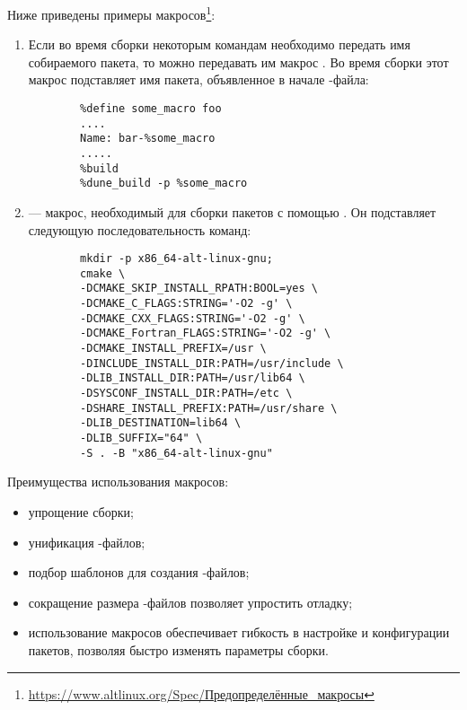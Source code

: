 Ниже приведены примеры макросов\footnote{\href{https://www.altlinux.org/Spec/\%D0\%9F\%D1\%80\%D0\%B5\%D0\%B4\%D0\%BE\%D0\%BF\%D1\%80\%D0\%B5\%D0\%B4\%D0\%B5\%D0\%BB\%D0\%B5\%D0\%BD\%D0\%BD\%D1\%8B\%D0\%B5_\%D0\%BC\%D0\%B0\%D0\%BA\%D1\%80\%D0\%BE\%D1\%81\%D1\%8B}{https://www.altlinux.org/Spec/Предопределённые\_макросы}}:
\begin{enumerate}
	\item {}
		Если во время сборки некоторым командам необходимо передать имя собираемого пакета,
		то можно передавать им макрос . Во время сборки этот макрос подставляет
		имя пакета, объявленное в начале -файла:
\begin{verbatim}
        %define some_macro foo
        ....
        Name: bar-%some_macro
        .....
        %build
        %dune_build -p %some_macro
\end{verbatim}
	
	\item {}
	 --- макрос, необходимый для сборки пакетов с помощью .
		Он подставляет следующую последовательность команд:
\begin{verbatim}
        mkdir -p x86_64-alt-linux-gnu;
        cmake \
        -DCMAKE_SKIP_INSTALL_RPATH:BOOL=yes \
        -DCMAKE_C_FLAGS:STRING='-O2 -g' \
        -DCMAKE_CXX_FLAGS:STRING='-O2 -g' \
        -DCMAKE_Fortran_FLAGS:STRING='-O2 -g' \
        -DCMAKE_INSTALL_PREFIX=/usr \
        -DINCLUDE_INSTALL_DIR:PATH=/usr/include \
        -DLIB_INSTALL_DIR:PATH=/usr/lib64 \
        -DSYSCONF_INSTALL_DIR:PATH=/etc \
        -DSHARE_INSTALL_PREFIX:PATH=/usr/share \
        -DLIB_DESTINATION=lib64 \
        -DLIB_SUFFIX="64" \
        -S . -B "x86_64-alt-linux-gnu"
\end{verbatim}
\end{enumerate}

Преимущества использования макросов:
\begin{itemize}
	\item упрощение сборки;
	\item унификация -файлов;
	\item подбор шаблонов для создания \Sys{spec}-файлов;
	\item сокращение размера \Sys{spec}-файлов позволяет упростить отладку;
	\item использование макросов обеспечивает гибкость в настройке и конфигурации
		пакетов, позволяя быстро изменять параметры сборки.
\end{itemize}

